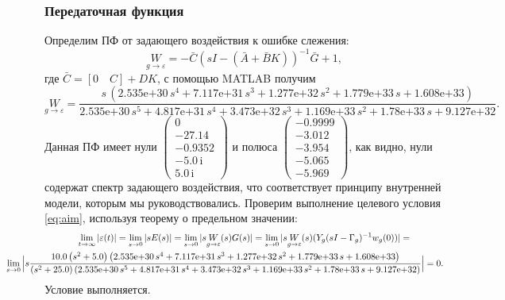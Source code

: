 \subsubsection{Передаточная функция}

Определим ПФ от задающего воздействия к ошибке слежения:
\begin{equation*}
    \underset{g\rightarrow\varepsilon}{W}=-\bar C(sI-(\bar A+\bar BK))^{-1}\bar G+1,
\end{equation*}
где $\bar C=[0\quad C] + DK$, с помощью MATLAB получим
\begin{equation*}
    \underset{g\rightarrow\varepsilon}{W}=\frac{s\,{\left(\text{2.535e+30}\,s^4 +\text{7.117e+31}\,s^3 +\text{1.277e+32}\,s^2 +\text{1.779e+33}\,s+\text{1.608e+33}\right)}}{\text{2.535e+30}\,s^5 +\text{4.817e+31}\,s^4 +\text{3.473e+32}\,s^3 +\text{1.169e+33}\,s^2 +\text{1.78e+33}\,s+\text{9.127e+32}}.
\end{equation*}
Данная ПФ имеет нули $\left(\begin{array}{c}
0\\
-27.14\\
-0.9352\\
-5.0\,\mathrm{i}\\
5.0\,\mathrm{i}
\end{array}\right)$ и полюса $\left(\begin{array}{c}
-0.9999\\
-3.012\\
-3.954\\
-5.065\\
-5.969
\end{array}\right)$, как видно, нули содержат спектр задающего воздействия, что 
соответствует принципу внутренней модели, которым мы руководствовались.
Проверим выполнение целевого условия \eqref{eq:aim}, используя теорему о предельном
значении:
\begin{multline*}
    \lim_{t\rightarrow\infty}|\varepsilon(t)|=\lim_{s\rightarrow0}|sE(s)|=
    \lim_{s\rightarrow0}|s\underset{g\rightarrow\varepsilon}{W}(s)G(s)|=
    \lim_{s\rightarrow0}|s\underset{g\rightarrow\varepsilon}{W}(s)(Y_g(sI-\Gamma_g)^{-1}w_{g}(0))|=\\
    \hspace*{-1.5cm}\lim_{s\rightarrow0}\Big|s\frac{10.0\,{\left(s^2 +5.0\right)}\,{\left(\text{2.535e+30}\,s^4 +\text{7.117e+31}\,s^3 +\text{1.277e+32}\,s^2 +\text{1.779e+33}\,s+\text{1.608e+33}\right)}}{{\left(s^2 +25.0\right)}\,{\left(\text{2.535e+30}\,s^5 +\text{4.817e+31}\,s^4 +\text{3.473e+32}\,s^3 +\text{1.169e+33}\,s^2 +\text{1.78e+33}\,s+\text{9.127e+32}\right)}}\Big|=0.
\end{multline*}
Условие выполняется.

